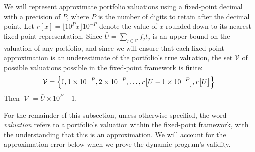 \documentclass[12pt]{article} %
\theoremstyle{definition}
\theoremstyle{definition}
\begin{document}
We will represent approximate portfolio valuations using a fixed-point decimal with a precision of $P$, where $P$ is the number of digits to retain after the decimal point. Let $r[x] = \lfloor 10^P x \rfloor 10^{-P}$ denote the value of $x$ rounded down to its nearest fixed-point representation. Since $\bar U = \sum_{j\in \mathcal{C}} f_j t_j$ is an upper bound on the valuation of any portfolio, and since we will ensure that each fixed-point approximation is an underestimate of the portfolio's true valuation, the set $\mathcal{V}$ of possible valuations possible in the fixed-point framework is finite:
\begin{equation}
\mathcal{V} = \Bigl\{0, 1\times 10^{-P}, 2\times 10^{-P}, \dots, r\bigl[\bar U- 1\times 10^{-P}\bigr], r\bigl[\bar U\bigr]\Bigr\}
\end{equation}
Then $|\mathcal{V} | = \bar U \times 10^P + 1$.

For the remainder of this subsection, unless otherwise specified, the word \emph{valuation} refers to a portfolio’s valuation within the fixed-point framework, with the understanding that this is an approximation. We will account for the approximation error below when we prove the dynamic program’s validity. 
\end{document}
